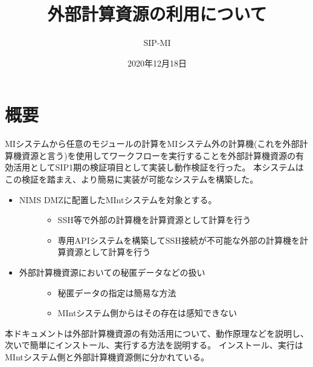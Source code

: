 \documentclass[letterpaper,10pt,dvipdfmx,openany]{sphinxmanual}
\title{外部計算資源の利用について}
\date{2020年12月18日}
\author{SIP-MI}
\begin{document}
\maketitle
\sphinxtableofcontents
{}\label{\detokenize{index::doc}}



\chapter{概要}
\label{\detokenize{using_distributed_properties:id1}}\label{\detokenize{using_distributed_properties::doc}}
MIシステムから任意のモジュールの計算をMIシステム外の計算機(これを外部計算機資源と言う)を使用してワークフローを実行することを外部計算機資源の有効活用としてSIP1期の検証項目として実装し動作検証を行った。
本システムはこの検証を踏まえ、より簡易に実装が可能なシステムを構築した。
\begin{itemize}
\item {} \begin{description}
\item[{NIMS DMZに配置したMIntシステムを対象とする。}] \leavevmode\begin{itemize}
\item {} 
SSH等で外部の計算機を計算資源として計算を行う

\item {} 
専用APIシステムを構築してSSH接続が不可能な外部の計算機を計算資源として計算を行う

\end{itemize}

\end{description}

\item {} \begin{description}
\item[{外部計算機資源においての秘匿データなどの扱い}] \leavevmode\begin{itemize}
\item {} 
秘匿データの指定は簡易な方法

\item {} 
MIntシステム側からはその存在は感知できない

\end{itemize}

\end{description}

\end{itemize}

本ドキュメントは外部計算機資源の有効活用について、動作原理などを説明し、次いで簡単にインストール、実行する方法を説明する。
インストール、実行はMIntシステム側と外部計算機資源側に分かれている。
\end{document}
